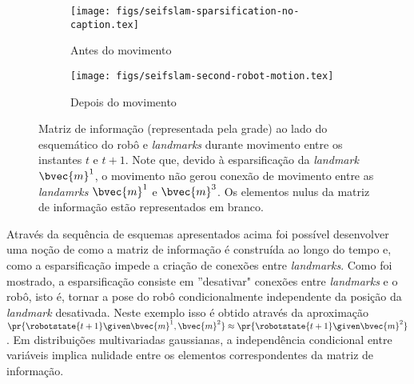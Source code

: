 \begin{figure}[h]
  \begin{subfigure}{0.475\textwidth}
    \texttt{[image: figs/seifslam-sparsification-no-caption.tex]}
    \caption{Antes do movimento}
  \end{subfigure}
  \hfill
  \begin{subfigure}{0.475\textwidth}
    \texttt{[image: figs/seifslam-second-robot-motion.tex]} 
    \caption{Depois do movimento}
    \label{fig:seifslam-info-matrix-construction-second-motion-b}
  \end{subfigure}
  \caption{Matriz de informação (representada pela grade) ao lado do esquemático do robô e \textit{landmarks} durante movimento entre os instantes $t$ e $t+1$. Note que, devido à esparsificação da \textit{landmark} $\bvec{m}^1$, o movimento não gerou conexão de movimento entre as \textit{landamrks} $\bvec{m}^1$ e $\bvec{m}^3$. Os elementos nulus da matriz de informação estão representados em branco.}
  \label{fig:seifslam-info-matrix-construction-second-motion}
\end{figure}

Através da sequência de esquemas apresentados acima foi possível 
desenvolver uma noção de como a matriz de informação é construída 
ao longo do tempo e, como a esparsificação impede a criação de 
conexões entre \textit{landmarks}. Como foi mostrado, a 
esparsificação consiste em ''desativar" conexões entre \textit{landmarks} e o robô, isto é, tornar a pose do robô 
condicionalmente independente da posição da \textit{landmark} 
desativada. Neste exemplo isso é obtido através da aproximação 
$\pr{\robotstate{t+1} \given \bvec{m}^1, \bvec{m}^2} \approx \pr{\robotstate{t+1} \given \bvec{m}^2}$. Em distribuições multivariadas gaussianas, a independência condicional entre 
variáveis implica nulidade entre os elementos correspondentes da matriz de informação.

